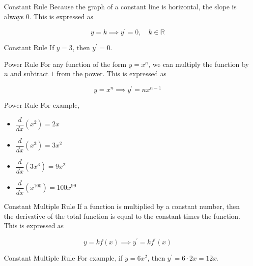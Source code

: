 \begin{rules}{Constant Rule}
    Because the graph of a constant line is horizontal, the slope is always \( 0 \). This is expressed as
    
    \[ y = k \implies y^\prime = 0, \quad k \in \mathbb{R} \]
\end{rules}

\begin{example}{Constant Rule}
    If \( y = 3 \), then \( y^\prime = 0 \).
\end{example}

\begin{rules}{Power Rule}
    For any function of the form \( y = x^n \), we can multiply the function by \( n \) and subtract \( 1 \) from the power. This is expressed as
    
    \[ y = x^n \implies y^\prime = nx^{n - 1} \]
\end{rules}

\begin{example}{Power Rule}
    For example,
    
    \begin{multicols}{2}
    \begin{itemize}
        \item \( \dfrac{d}{dx} \left( x^2 \right) = 2x \)
        \item \( \dfrac{d}{dx} \left( x^3 \right) = 3x^2 \)
        \item \( \dfrac{d}{dx} \left( 3x^3 \right) = 9x^2 \)
        \item \( \dfrac{d}{dx} \left( x^{100} \right) = 100x^{99} \)
    \end{itemize}
    \end{multicols}
    \vspace{0.1cm}
\end{example}

\begin{rules}{Constant Multiple Rule}
    If a function is multiplied by a constant number, then the derivative of the total function is equal to the constant times the function. This is expressed as
    
    \[ y = k f \left( x \right) \implies y^\prime = k f^\prime \left( x \right) \]
\end{rules}

\begin{example}{Constant Multiple Rule}
    For example, if \( y = 6x^2 \), then \( y^\prime = 6 \cdot 2x = 12 x \).
\end{example}

